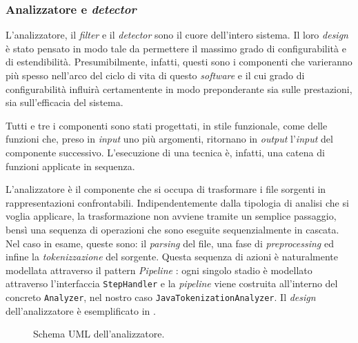 \subsubsection*{Analizzatore e \textit{detector}}
L'analizzatore, il \textit{filter} e il \textit{detector} sono il cuore dell'intero sistema.
%
Il loro \textit{design} è stato pensato in modo tale da permettere il massimo grado di configurabilità e di estendibilità.
%
Presumibilmente, infatti, questi sono i componenti che varieranno più spesso nell'arco del ciclo di vita di questo \textit{software} e il cui grado di configurabilità influirà certamentente in modo preponderante sia sulle prestazioni, sia sull'efficacia del sistema.

Tutti e tre i componenti sono stati progettati, in stile funzionale, come delle funzioni che, preso in \textit{input} uno più argomenti, ritornano in \textit{output} l'\textit{input} del componente successivo.
%
L'esecuzione di una tecnica è, infatti, una catena di funzioni applicate in sequenza.

L'analizzatore è il componente che si occupa di trasformare i file sorgenti in rappresentazioni confrontabili.
%
Indipendentemente dalla tipologia di analisi che si voglia applicare, la trasformazione non avviene tramite un semplice passaggio, bensì una sequenza di operazioni che sono eseguite sequenzialmente in cascata.
%
Nel caso in esame, queste sono: il \textit{parsing} del file, una fase di \textit{preprocessing} ed infine la \textit{tokenizzazione} del sorgente.
%
Questa sequenza di azioni è naturalmente modellata attraverso il pattern \textit{Pipeline} \cite{pipeline-pattern}: ogni singolo stadio è modellato attraverso l'interfaccia \texttt{StepHandler} e la \textit{pipeline} viene costruita all'interno del concreto \texttt{Analyzer}, nel nostro caso \texttt{JavaTokenizationAnalyzer}.
%
Il \textit{design} dell'analizzatore è esemplificato in .

\begin{figure}[h!]
    \caption{Schema UML dell'analizzatore.}
    \label{img:02-analyzer}
\end{figure}

